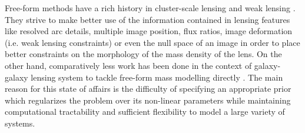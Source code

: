 Free-form methods have a rich history in cluster-scale lensing \citep{Bartelmann1996,Seitz1998,Abdelsalam1998,Abdelsalam1998b,Bradac2005,Diego2005,Cacciato2006,Diego2007,Liesenborgs2006,Liesenborgs2007,Jee2007,Coe2008,Merten2009,Deb2012,Merten2016,Ghosh2020,Torres-Ballestros2022} and weak lensing \citep{Kaiser1993,Marshall2001,Massey2007,Deb2008,Simon2012,Leonard2012,Lanusse2016,Jeffrey2020,Starck2021,Remy2022}. They strive to make better use of the information contained in lensing features like resolved arc details, multiple image position, flux ratios, image deformation (i.e. weak lensing constraints) or even the null space of an image in order to place better constraints on the morphology of the mass density of the lens.
On the other hand, comparatively less work has been done in the context of galaxy-galaxy lensing system to tackle free-form mass modelling directly \citep{Saha1997,Saha2004,Birrer2015,Coles2014}. The main reason for this state of affairs is the difficulty of specifying an appropriate prior which regularizes the problem over its non-linear parameters while maintaining computational tractability and sufficient flexibility to model a large variety of systems. 


